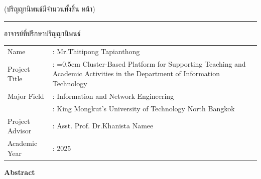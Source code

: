 \begin{flushright}
(ปริญญานิพนธ์มีจำนวนทั้งสิ้น \pageref{LastPage} หน้า)

\vfill
\rule{10 cm}{0.4pt} อาจารย์ที่ปรึกษาปริญญานิพนธ์ 

\end{flushright}





\newpage
{}
{}
\vspace*{-0.5in}

\begin{tabularx}{\textwidth}{lX}
Name                    & : Mr.Thitipong Tapianthong  %
\\
Project Title           & : \hangindent=0.5em %
                            Cluster-Based Platform for Supporting Teaching and
                            Academic Activities in the Department of Information Technology  %
\\
Major Field             & : Information and Network Engineering %
\\
                        & : King Mongkut’s University of Technology North Bangkok
\\
Project Advisor         & : Asst. Prof. Dr.Khanista Namee   %
\\
Academic Year           & : 2025    %
\end{tabularx}

\vspace{5mm}
\begin{center}\textbf{Abstract}\end{center}

